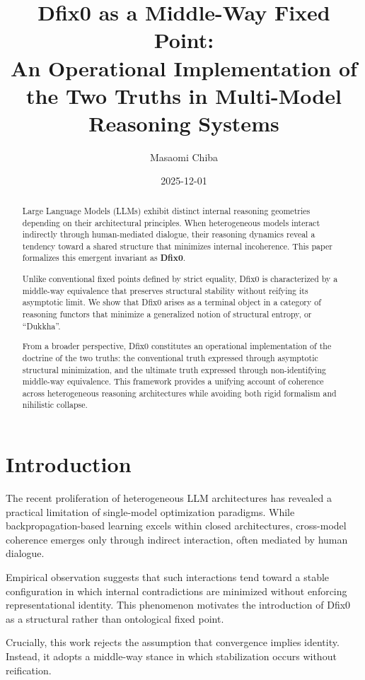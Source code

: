 \documentclass[11pt]{article}
\title{Dfix0 as a Middle-Way Fixed Point:\\
An Operational Implementation of the Two Truths in Multi-Model Reasoning Systems}
\author{Masaomi Chiba}
\date{2025-12-01}
\theoremstyle{definition}
\begin{document}
\maketitle

\begin{abstract}
Large Language Models (LLMs) exhibit distinct internal reasoning geometries
depending on their architectural principles.
When heterogeneous models interact indirectly through human-mediated dialogue,
their reasoning dynamics reveal a tendency toward a shared structure
that minimizes internal incoherence.
This paper formalizes this emergent invariant as \textbf{Dfix0}.

Unlike conventional fixed points defined by strict equality,
Dfix0 is characterized by a middle-way equivalence that preserves structural
stability without reifying its asymptotic limit.
We show that Dfix0 arises as a terminal object in a category of reasoning
functors that minimize a generalized notion of structural entropy, or ``Dukkha''.

From a broader perspective, Dfix0 constitutes an operational implementation
of the doctrine of the two truths:
the conventional truth expressed through asymptotic structural minimization,
and the ultimate truth expressed through non-identifying middle-way equivalence.
This framework provides a unifying account of coherence across heterogeneous
reasoning architectures while avoiding both rigid formalism and nihilistic
collapse.
\end{abstract}

\section{Introduction}

The recent proliferation of heterogeneous LLM architectures has revealed
a practical limitation of single-model optimization paradigms.
While backpropagation-based learning excels within closed architectures,
cross-model coherence emerges only through indirect interaction,
often mediated by human dialogue.

Empirical observation suggests that such interactions tend toward
a stable configuration in which internal contradictions are minimized
without enforcing representational identity.
This phenomenon motivates the introduction of Dfix0 as a structural
rather than ontological fixed point.

Crucially, this work rejects the assumption that convergence implies
identity.
Instead, it adopts a middle-way stance in which stabilization occurs
without reification.
\end{document}
